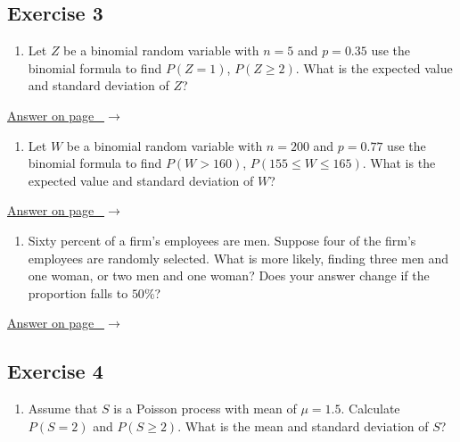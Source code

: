 \documentclass[
  11pt,
  letterpaper,
  DIV=11,
  numbers=noendperiod,
  oneside,
  open=any]{scrreprt}
\providecommand{\tightlist}{%
  \setlength{\itemsep}{0pt}\setlength{\parskip}{0pt}}\usepackage{longtable,booktabs,array}
\newcommand{\bsanswerref}[1]{%
  \par\nopagebreak\hypertarget{q-#1}{}\label{q-#1}%
  {\raggedleft\sffamily\footnotesize\hyperlink{a-#1}{\textcolor{bsaccent}{Answer on page \pageref{a-#1}\ $\rightarrow$}}\par}%
  \medskip}
\begin{document}
\subsection*{Exercise 3}\label{exercise-3-7}

\begin{enumerate}
\def\labelenumi{\arabic{enumi}.}
\tightlist
\item
  Let \(Z\) be a binomial random variable with \(n=5\) and \(p=0.35\)
  use the binomial formula to find \(P(Z=1)\), \(P(Z \geq 2)\). What is
  the expected value and standard deviation of \(Z\)?
\end{enumerate}

\bsanswerref{bsans88}

\begin{enumerate}
\def\labelenumi{\arabic{enumi}.}
\setcounter{enumi}{1}
\tightlist
\item
  Let \(W\) be a binomial random variable with \(n=200\) and \(p=0.77\)
  use the binomial formula to find \(P(W>160)\),
  \(P(155 \leq W \leq 165)\). What is the expected value and standard
  deviation of \(W\)?
\end{enumerate}

\bsanswerref{bsans89}

\begin{enumerate}
\def\labelenumi{\arabic{enumi}.}
\setcounter{enumi}{2}
\tightlist
\item
  Sixty percent of a firm's employees are men. Suppose four of the
  firm's employees are randomly selected. What is more likely, finding
  three men and one woman, or two men and one woman? Does your answer
  change if the proportion falls to \(50\)\%?
\end{enumerate}

\bsanswerref{bsans90}

\subsection*{Exercise 4}\label{exercise-4-6}

\begin{enumerate}
\def\labelenumi{\arabic{enumi}.}
\tightlist
\item
  Assume that \(S\) is a Poisson process with mean of \(\mu=1.5\).
  Calculate \(P(S=2)\) and \(P(S \geq 2)\). What is the mean and
  standard deviation of \(S\)?
\end{enumerate}
\end{document}
